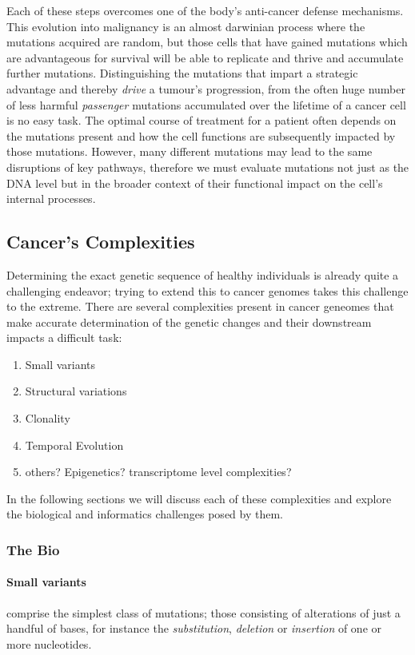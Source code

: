 Each of these steps overcomes one of the body's anti-cancer defense mechanisms. This evolution into malignancy is an almost darwinian process where the mutations acquired are random, but those cells that have gained mutations which are advantageous for survival will be able to replicate and thrive and accumulate further mutations. Distinguishing the mutations that impart a strategic advantage and thereby \emph{drive} a tumour's progression, from the often huge number of less harmful \emph{passenger} mutations accumulated over the lifetime of a cancer cell is no easy task. The optimal course of treatment for a patient often depends on the mutations present and how the cell functions are subsequently impacted by those mutations. However, many different mutations may lead to the same disruptions of key pathways, therefore we must evaluate mutations not just as the DNA level but in the broader context of their functional impact on the cell's internal processes.


\subsection{Cancer's Complexities}

Determining the exact genetic sequence of healthy individuals is already quite a challenging endeavor; trying to extend this to cancer genomes takes this challenge to the extreme. There are several complexities present in cancer geneomes that make accurate determination of the genetic changes and their downstream impacts a difficult task:

\begin{enumerate}
\item Small variants
\item Structural variations
\item Clonality
\item Temporal Evolution
\item others? Epigenetics? transcriptome level complexities?
\end{enumerate}

In the following sections we will discuss each of these complexities and explore the biological and informatics challenges posed by them.

\subsubsection{The Bio}
\paragraph{Small variants} comprise the simplest class of mutations; those consisting of alterations of just a handful of bases, for instance the \emph{substitution}, \emph{deletion} or \emph{insertion} of one or more nucleotides.

